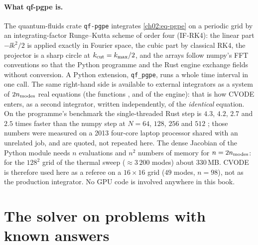 \paragraph{What qf-pgpe is.} The quantum-fluids crate \texttt{qf-pgpe} integrates \cref{ch02:eq-pgpe} on a periodic grid by an integrating-factor Runge--Kutta scheme of order four (IF-RK4): the linear part
$-\ii k^2/2$ is applied exactly in Fourier space, the cubic part by classical RK4, the projector is a sharp circle at $k_{\rm cut}=k_{\max}/2$, and the arrays follow numpy's FFT conventions so that the
Python programme and the Rust engine exchange fields without conversion. A Python extension, \texttt{qf\_pgpe}, runs a whole time interval in one call. The same right-hand side is available to external integrators as a
system of $2n_{\rm modes}$ real equations (the functions ,  and  of the engine): that is how CVODE enters, as a second integrator, written independently, of the \emph{identical}
equation. On the programme's benchmark the single-threaded Rust step is $4.3$, $4.2$, $2.7$ and $2.5$ times faster than the numpy step at $N=64$, $128$, $256$ and $512$ \cite{Callens2026sw}; those
numbers were measured on a 2013 four-core laptop processor shared with an unrelated job, and are quoted, not repeated here. The dense Jacobian of the Python module needs $n$ evaluations and $n^2$ numbers of memory for
$n=2n_{\rm modes}$: for the $128^2$ grid of the thermal sweep ($\approx3\,200$ modes) about $330$\,MB. CVODE is therefore used here as a referee on a $16\times16$ grid ($49$ modes,
$n=98$), not as the production integrator. No GPU code is involved anywhere in this book.

\section{The solver on problems with known answers}\label{ch02:known}

